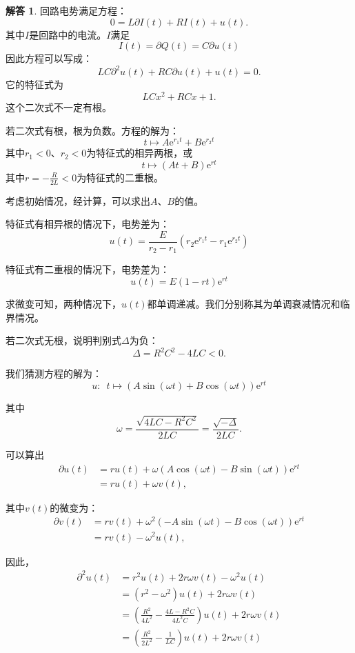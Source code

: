 \documentclass[12pt,UTF8]{ctexbook}
\newcommand{\e}{\mathrm{e}}
\theoremstyle{definition}
\newtheorem*{so}{解答}
\theoremstyle{plain}
\begin{document}
\begin{so}
    回路电势满足方程：
    $$ 0 = L\partial I(t) + RI(t) + u(t).$$
    其中$I$是回路中的电流。$I$满足
    $$ I(t) = \partial Q(t) = C\partial u(t) $$
    因此方程可以写成：
    $$ LC\partial^2 u(t) + RC\partial u(t) + u(t) = 0.$$
    它的特征式为
    $$ LC x^2 + RC x + 1.$$
    这个二次式不一定有根。

    若二次式有根，根为负数。方程的解为：
    $$ t \mapsto A\e^{r_1t} + B\e^{r_2t} $$
    其中$r_1<0$、$r_2<0$为特征式的相异两根，或
    $$ t \mapsto (At + B)\e^{rt} $$
    其中$r = -\frac{R}{2L} < 0$为特征式的二重根。

    考虑初始情况，经计算，可以求出$A$、$B$的值。

    特征式有相异根的情况下，电势差为：
    $$ u(t) = \frac{E}{r_2 - r_1}\left(r_2\e^{r_1t} - r_1\e^{r_2t}\right) $$ 

    特征式有二重根的情况下，电势差为：
    $$ u(t) =  E(1 - rt)\e^{rt}$$

    求微变可知，两种情况下，$u(t)$都单调递减。我们分别称其为单调衰减情况和临界情况。

    若二次式无根，说明判别式$\Delta$为负：
    $$ \Delta = R^2C^2 - 4LC < 0.$$

    我们猜测方程的解为：
    $$ u: \,\,\,t \mapsto \left(A\sin{(\omega t)} + B\cos{(\omega t)}\right)\e^{rt} $$

    其中
    $$\omega = \frac{\sqrt{4LC - R^2C^2}}{2LC} = \frac{\sqrt{-\Delta}}{2LC}. $$

    可以算出
    \begin{align*}
        \partial u(t) &= ru(t) + \omega \left(A\cos{(\omega t)} - B\sin{(\omega t)}\right)\e^{rt} \\
        &= ru(t) + \omega v(t),
    \end{align*}

    其中$v(t)$的微变为：
    \begin{align*}
        \partial v(t) &= rv(t) + \omega^2 \left(- A\sin{(\omega t)} - B\cos{(\omega t)}\right)\e^{rt} \\
        &= rv(t) - \omega^2 u(t),
    \end{align*}

    因此，
    \begin{align*}        
        \partial^2 u(t) &= r^2u(t) + 2r\omega v(t) - \omega^2u(t) \\
        &= (r^2 - \omega^2 )u(t) + 2r\omega v(t) \\
        &= \left(\frac{R^2}{4L^2} - \frac{4L - R^2C}{4L^2C}\right)u(t) + 2r\omega v(t)\\
        &= \left(\frac{R^2}{2L^2} - \frac{1}{LC} \right)u(t) + 2r\omega v(t)
    \end{align*}


\end{so}
\end{document}
